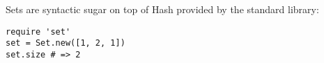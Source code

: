Sets are syntactic sugar on top of Hash provided by the standard library:
\begin{verbatim}
require 'set'
set = Set.new([1, 2, 1])
set.size # => 2
\end{verbatim}
